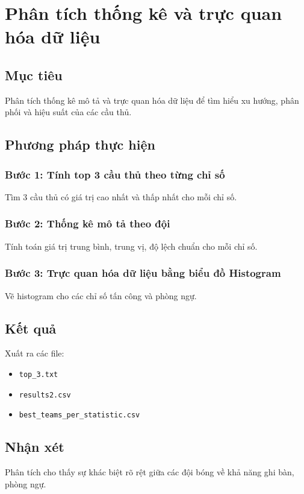 \documentclass[12pt,a4paper]{article}
\begin{document}
\section{Phân tích thống kê và trực quan hóa dữ liệu}

\subsection{Mục tiêu}
Phân tích thống kê mô tả và trực quan hóa dữ liệu để tìm hiểu xu hướng, phân phối và hiệu suất của các cầu thủ.

\subsection{Phương pháp thực hiện}

\subsubsection{Bước 1: Tính top 3 cầu thủ theo từng chỉ số}
Tìm 3 cầu thủ có giá trị cao nhất và thấp nhất cho mỗi chỉ số.

\subsubsection{Bước 2: Thống kê mô tả theo đội}
Tính toán giá trị trung bình, trung vị, độ lệch chuẩn cho mỗi chỉ số.

\subsubsection{Bước 3: Trực quan hóa dữ liệu bằng biểu đồ Histogram}
Vẽ histogram cho các chỉ số tấn công và phòng ngự.

\subsection{Kết quả}
Xuất ra các file:
\begin{itemize}
\item \texttt{top\_3.txt}
\item \texttt{results2.csv}
\item \texttt{best\_teams\_per\_statistic.csv}
\end{itemize}

\subsection{Nhận xét}
Phân tích cho thấy sự khác biệt rõ rệt giữa các đội bóng về khả năng ghi bàn, phòng ngự.
\end{document}
